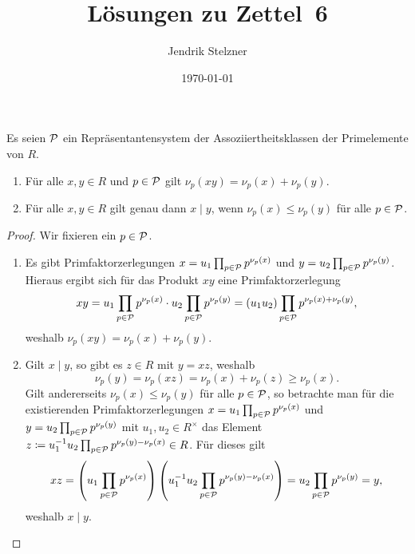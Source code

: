 \documentclass[a4paper,10pt,numbers=noenddot]{scrartcl}
\title{Lösungen zu Zettel~6}
\author{Jendrik Stelzner}
\date{\today}
\begin{document}
\maketitle





\section{}

Es seien $\mathcal{P}$ ein Repräsentantensystem der Assoziiertheitsklassen der Primelemente von $R$.

\begin{lemma}
  \begin{enumerate}
    \item
      Für alle $x, y \in R$ und $p \in \mathcal{P}$ gilt $\nu_p(x y) = \nu_p(x) + \nu_p(y)$.
    \item
      Für alle $x, y \in R$ gilt genau dann $x \mid y$, wenn $\nu_p(x) \leq \nu_p(y)$ für alle $p \in \mathcal{P}$.
  \end{enumerate}
\end{lemma}

\begin{proof}
  Wir fixieren ein $p \in \mathcal{P}$.
  \begin{enumerate}
    \item
      Es gibt Primfaktorzerlegungen $x = u_1 \prod_{p \in \mathcal{P}} p^{\nu_p(x)}$ und $y = u_2 \prod_{p \in \mathcal{P}} p^{\nu_p(y)}$.
      Hieraus ergibt sich für das Produkt $x y$ eine Primfaktorzerlegung
      \[
          x y
        = u_1 \prod_{p \in \mathcal{P}} p^{\nu_p(x)} \cdot u_2 \prod_{p \in \mathcal{P}} p^{\nu_p(y)}
        = (u_1 u_2) \prod_{p \in \mathcal{P}} p^{\nu_p(x) + \nu_p(y)},
      \]
      weshalb $\nu_p(x y) = \nu_p(x) + \nu_p(y)$.
    \item
      Gilt $x \mid y$, so gibt es $z \in R$ mit $y = x z$, weshalb
      \[
              \nu_p(y)
        =     \nu_p(x z)
        =     \nu_p(x) + \nu_p(z)
        \geq  \nu_p(x).
      \]
      Gilt andererseits $\nu_p(x) \leq \nu_p(y)$ für alle $p \in \mathcal{P}$, so betrachte man für die existierenden Primfaktorzerlegungen $x  = u_1 \prod_{p \in \mathcal{P}} p^{\nu_p(x)}$ und $y = u_2 \prod_{p \in \mathcal{P}} p^{\nu_p(y)}$ mit $u_1, u_2 \in R^\times$ das Element $z \coloneqq u_1^{-1} u_2 \prod_{p \in \mathcal{P}} p^{\nu_p(y) - \nu_p(x)} \in R$.
      Für dieses gilt
      \[
          x z
        = \left( u_1 \prod_{p \in \mathcal{P}} p^{\nu_p(x)} \right)
          \left( u_1^{-1} u_2 \prod_{p \in \mathcal{P}} p^{\nu_p(y) - \nu_p(x)} \right)
        = u_2 \prod_{p \in \mathcal{P}} p^{\nu_p(y)}
        = y,
      \]
      weshalb $x \mid y$.
    \qedhere
  \end{enumerate}
\end{proof}
\end{document}
